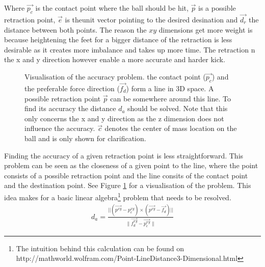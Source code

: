 \documentclass[a4paper]{article}
\begin{document}
Where $\vec{p_c}$ is the contact point where the ball should be hit,
$\vec{p}$ is a possible retraction point, $\vec{e}$ is theunit vector pointing
to the desired desination and $\vec{d_r}$ the distance between both
points. The reason the ${xy}$ dimensions get more weight is because heightening
the feet for a bigger distance of the retraction is less desirable as it creates
more imbalance and takes up more time. The retraction n the x and y direction
however enable a more accurate and harder kick.

\begin{figure}
  \resizebox{\textwidth}{!} {
    }
    \caption{Visualisation of the accuracy problem. \small{the contact point
            ($\vec{p_c}$) and the preferable force direction ($\vec{f_d}$) form a line
    in 3D space. A possible retraction point $\vec{p}$ can be somewhere around
    this line. To find its accuracy the distance $d_a$ should be solved. Note that
    this only concerns the x and y direction as the z dimension does not
    influence the accuracy. $\vec{c}$ denotes the center of mass
    location on the ball and is only shown for clarification.}}
    \label{fig:accuracy}
\end{figure}    

Finding the accuracy of a given retraction point is less straightforward. This
problem can be seen as the closeness of a given point to the line, where the
point consists of a possible retraction point and the line consits of the
contact point and the destination point. See Figure \ref{fig:accuracy} for a
visualisation of the problem. This idea makes for a basic linear algebra\footnote{The intuition behind this calculation can be found on http://mathworld.wolfram.com/Point-LineDistance3-Dimensional.html }
problem that needs to be resolved.
\begin{align*}
    d_a = \frac{||(\vec{p^{xy}} - p_c^{xy}) \times (\vec{p^{xy}} -
    \vec{f_d})||}{\|\vec{f_d^{xy}}- \vec{p_c^{xy}}\|}
\end{align*}
\end{document}
